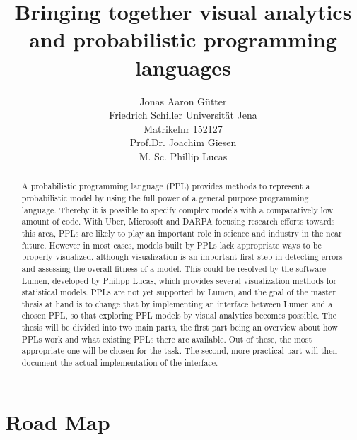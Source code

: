 \documentclass{article}
\title{Bringing together visual analytics and probabilistic programming languages}
\author{Jonas Aaron Gütter  \\
	Friedrich Schiller Universität Jena  \\
    Matrikelnr 152127 \\
    Prof.Dr. Joachim Giesen \\
    M. Sc. Phillip Lucas
	}
\begin{document}
\maketitle

\begin{abstract}
A probabilistic programming language (PPL) provides methods to represent a probabilistic model by using the full power of a general purpose programming language. Thereby it is possible to specify complex models with a comparatively low amount of code. With Uber, Microsoft and DARPA focusing research efforts towards this area, PPLs are likely to play an important role in science and industry in the near future.
However in most cases, models built by PPLs lack appropriate ways to be properly visualized, although visualization is an important first step in detecting errors and assessing the overall fitness of a model. This could be resolved by the software Lumen, developed by Philipp Lucas, which provides several visualization methods for statistical models. PPLs are not yet supported by Lumen, and the goal of the master thesis at hand is to change that by implementing an interface between Lumen and a chosen PPL, so that exploring PPL models by visual analytics becomes possible.
The thesis will be divided into two main parts, the first part being an overview about how PPLs work and what existing PPLs there are available. Out of these, the most appropriate one will be chosen for the task. The second, more practical part will then document the actual implementation of the interface.

\end{abstract}

\tableofcontents


\printglossaries
\section{Road Map}
\end{document}
